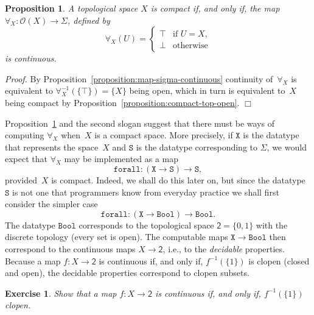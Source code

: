 \documentclass[a4paper,11pt]{article}
\newtheorem{proposition}[theorem]{Proposition}
\newtheorem{exercise}[theorem]{Exercise}
\newenvironment{proof}{\par\noindent\textit{Proof.}}{\hfill$\Box$\par\medskip}
\newcommand{\set}[1]{\{#1\}}
\newcommand{\tpl}[1]{\mathcal{O}(#1)}
\newcommand{\two}{\mathsf{2}}
\newcommand{\Bool}{\mathtt{Bool}}
\begin{document}
\begin{proposition}
  \label{proposition:compact-iff-forall-continuous}
  A topological space $X$ is compact if, and only if, the map
  $\forall_X : \tpl{X} \to \Sigma$, defined by
  \begin{equation*}
    \forall_X(U) =
    \begin{cases}
      \top & \text{if $U = X$,}\\
      \bot & \text{otherwise}
    \end{cases}    
  \end{equation*}
  is continuous.
\end{proposition}

\begin{proof}
  By Proposition~\ref{proposition:map-sigma-continuous} continuity
  of~$\forall_X$ is equivalent to $\forall_X^{-1}(\set{\top}) =
  \set{X}$ being open, which in turn is equivalent to~$X$ being
  compact by Proposition~\ref{proposition:compact-top-open}.
\end{proof}

Proposition~\ref{proposition:compact-iff-forall-continuous} and the
second slogan suggest that there must be ways of computing $\forall_X$
when~$X$ is a compact space. More precisely, if $\mathtt{X}$ is the
datatype that represents the space~$X$ and $\mathtt{S}$ is the
datatype corresponding to $\Sigma$, we would expect that $\forall_X$
may be implemented as a map
%
\begin{equation*}
  \mathtt{forall} : (\mathtt{X} \to \mathtt{S}) \to \mathtt{S},
\end{equation*}
%
provided~$X$ is compact. Indeed, we shall do this later on, but since
the datatype $\mathtt{S}$ is not one that programmers know from
everyday practice we shall first consider the simpler case
%
\begin{equation}
  \label{eq:forall-bool}
  \mathtt{forall} : (\mathtt{X} \to \Bool) \to \Bool.
\end{equation}
%
The datatype $\Bool$ corresponds to the topological space
$\two = \set{0, 1}$ with the discrete topology (every set is open).
The computable maps $\mathtt{X} \to \Bool$ then correspond to
the continuous maps $X \to \two$, i.e., to the \emph{decidable}
properties. Because a map $f : X \to \two$ is continuous if, and only
if, $f^{-1}(\set{1})$ is clopen (closed and open), the decidable
properties correspond to clopen subsets.

\begin{exercise}
  Show that a map $f : X \to \two$ is continuous if, and only if,
  $f^{-1}(\set{1})$ clopen.
\end{exercise}
\end{document}
